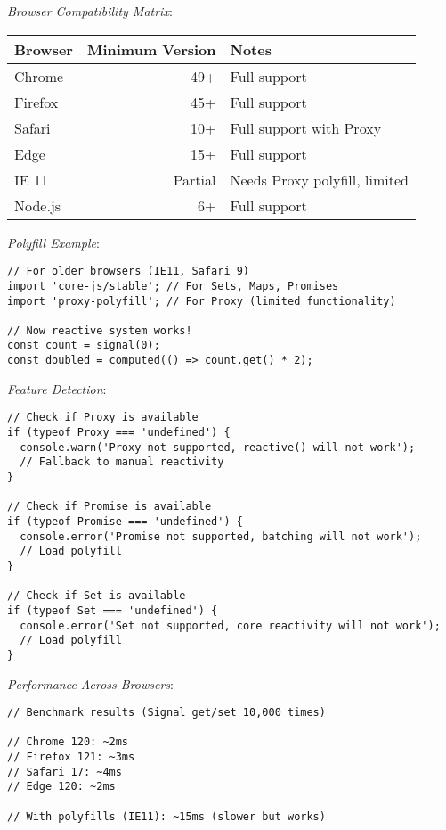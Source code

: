 \documentclass[11pt]{article}
\begin{document}
\emph{Browser Compatibility Matrix}:

\begin{center}
\begin{tabular}{lrl}
Browser & Minimum Version & Notes\\
\hline
Chrome & 49+ & Full support\\
Firefox & 45+ & Full support\\
Safari & 10+ & Full support with Proxy\\
Edge & 15+ & Full support\\
IE 11 & Partial & Needs Proxy polyfill, limited\\
Node.js & 6+ & Full support\\
\end{tabular}
\end{center}

\emph{Polyfill Example}:

\begin{verbatim}
// For older browsers (IE11, Safari 9)
import 'core-js/stable'; // For Sets, Maps, Promises
import 'proxy-polyfill'; // For Proxy (limited functionality)

// Now reactive system works!
const count = signal(0);
const doubled = computed(() => count.get() * 2);
\end{verbatim}

\emph{Feature Detection}:

\begin{verbatim}
// Check if Proxy is available
if (typeof Proxy === 'undefined') {
  console.warn('Proxy not supported, reactive() will not work');
  // Fallback to manual reactivity
}

// Check if Promise is available
if (typeof Promise === 'undefined') {
  console.error('Promise not supported, batching will not work');
  // Load polyfill
}

// Check if Set is available
if (typeof Set === 'undefined') {
  console.error('Set not supported, core reactivity will not work');
  // Load polyfill
}
\end{verbatim}

\emph{Performance Across Browsers}:

\begin{verbatim}
// Benchmark results (Signal get/set 10,000 times)

// Chrome 120: ~2ms
// Firefox 121: ~3ms
// Safari 17: ~4ms
// Edge 120: ~2ms

// With polyfills (IE11): ~15ms (slower but works)
\end{verbatim}
\end{document}
